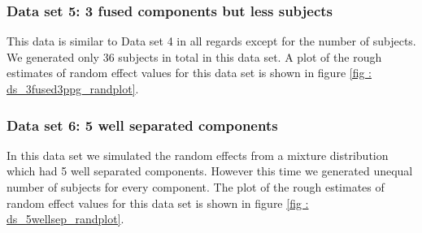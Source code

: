 \subsubsection{Data set 5: 3 fused components but less subjects}
\label{subsubsec : ds_3fused_3ppg}
This data is similar to Data set 4 in all regards except for the number of subjects. We generated only 36 subjects in total in this data set. A plot of the rough estimates of random effect values for this data set is shown in figure \ref{fig : ds_3fused3ppg_randplot}.

\subsubsection{Data set 6: 5 well separated components}
\label{subsubsec : ds_5wellsep}
In this data set we simulated the random effects from a mixture distribution which had 5 well separated components. However this time we generated unequal number of subjects for every component. The plot of the rough estimates of random effect values for this data set is shown in figure \ref{fig : ds_5wellsep_randplot}.

